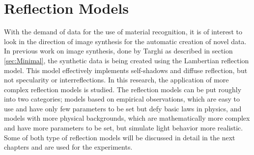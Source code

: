 \section{Reflection Models}\label{sec:ReflectionModels}
With the demand of data for the use of material recognition, it is of interest to look in the direction of image synthesis for the automatic creation of novel data. In previous work on image synthesis, done by Targhi as described in section \ref{sec:Minimal}, the synthetic data is being created using the Lambertian reflection model. This model effectively implements self-shadows and diffuse reflection, but not specularity or interreflections. In this research, the application of more complex reflection models is studied. The reflection models can be put roughly into two categories; models based on empirical observations, which are easy to use and have only few parameters to be set but defy basic laws in physics, and models with more physical backgrounds, which are mathematically more complex and have more parameters to be set, but simulate light behavior more realistic. Some of both type of reflection models will be discussed in detail in the next chapters and are used for the experiments.


